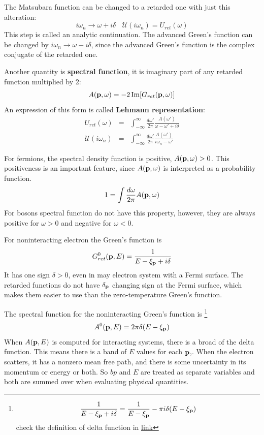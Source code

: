 The Matsubara function can be changed to a retarded one with just this alteration:
\begin{equation}
  i\omega_n \to \omega + i\delta~ ~ ~ ~ \mathcal{U}(i\omega_n) = U_{ret}(\omega)  \label{3.110}
\end{equation}
This step is called an analytic continuation.
The advanced Green's function can be changed by $i\omega_n \to \omega - i\delta$, since the advanced Green's function is the complex conjugate of the retarded one.

Another quantity is \textbf{spectral function}, it is imaginary part of any retarded function multiplied by 2:
\begin{equation}
  A(\mathbf{p},\omega) = -2\Im [G_{ret}(\mathbf{p},\omega)]  \label{3.115}
\end{equation}
An expression of this form is called \textbf{Lehmann representation}:
\begin{eqnarray}
  U_{ret}(\omega) &=& \int_{-\infty}^\infty \frac{d\omega'}{2\pi} \frac{A(\omega')}{\omega-\omega'+i\delta} \nonumber \\
  \mathcal{U}(i\omega_n) &=& \int_{-\infty}^\infty \frac{d\omega'}{2\pi} \frac{A(\omega')}{i\omega_n -\omega'} \label{3.118}
\end{eqnarray}

For fermions, the spectral density function is positive, $A(\mathbf{p},\omega)>0$.
This positiveness is an important feature, since $A(\mathbf{p},\omega)$ is interpreted as a probability function.
\begin{equation}
    1 = \int \frac{d\omega}{2\pi} A(\mathbf{p},\omega) \label{3.121}
\end{equation}
For bosons spectral function do not have this property, however, they are always positive for $\omega>0$ and negative for $\omega<0$.

For noninteracting electron the Green's function is
\begin{equation}
  G_{ret}^0 (\mathbf{p},E)= \frac{1}{E-\xi_{\mathbf{p}} + i\delta} \label{3.129}
\end{equation}
It has one sign $\delta>0$, even in may electron system with a Fermi surface.
The retarded functions do not have $\delta_{\mathbf{p}}$ changing sign at the Fermi surface, which makes them easier to use than the zero-temperature Green's function.

The spectral function for the noninteracting Green's function is \footnote{\begin{equation*}
\frac{1}{E-\xi_{\mathbf{p}} + i\delta} = \frac{1}{E-\xi_{\mathbf{p}}} - \pi i \delta(E-\xi_{\mathbf{p}})
\end{equation*}
check the definition of delta function in \href{https://mathworld.wolfram.com/DeltaFunction.html}{link}}
\begin{equation}
    A^0(\mathbf{p}, E) = 2\pi \delta(E-\xi_{\mathbf{p}}) \label{3.130}
\end{equation}
When $A(\mathbf{p},E)$ is computed for interacting systems, there is a broad of the delta function.
This means there is a band of $E$ values for each $\mathbf{p}$,.
When the electron scatters, it has a nonzero mean free path, and there is some uncertainty in its momentum or energy or both.
So $bp$ and $E$ are treated as separate variables and both are summed over when evaluating physical quantities.

